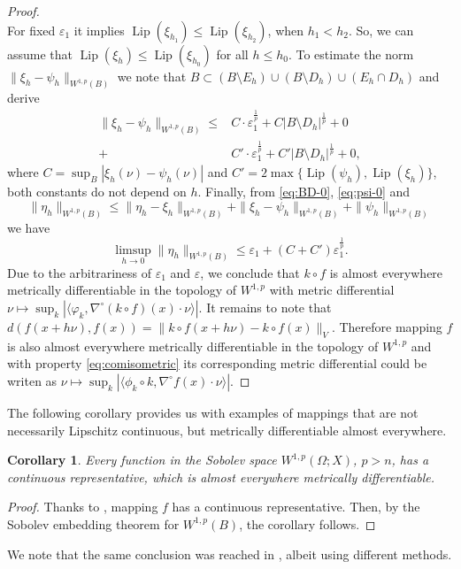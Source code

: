 \documentclass[reqno]{amsart}
\newtheorem{cor}[thm]{Corollary}
\begin{document}
\begin{proof}
\[\]
For fixed $\varepsilon_1$ it implies $\operatorname{Lip}(\xi_{h_1}) \leq \operatorname{Lip}(\xi_{h_2})$, when $h_1<h_2$.
So, we can assume that $\operatorname{Lip}(\xi_h) \leq \operatorname{Lip}(\xi_{h_0})$ for all $h\leq h_0$.
To estimate the norm $\|\xi_h - \psi_h \|_{W^{1,p}(B)}$ we note that $B\subset (B\setminus E_h)\cup (B\setminus D_h)\cup (E_h\cap D_h)$
and derive
\begin{align*}
\|\xi_h - \psi_h \|_{W^{1,p}(B)} \leq &C\cdot\varepsilon_1^{\frac{1}{p}} + C|B\setminus D_h|^{\frac{1}{p}} + 0\\
+ &C'\cdot\varepsilon_1^{\frac{1}{p}} + C'|B\setminus D_h|^{\frac{1}{p}} + 0,
\end{align*}
where $C = \sup_{B}|\xi_h(\nu) - \psi_h(\nu)| $ and $C' = 2\max\{\operatorname{Lip}(\psi_h), \operatorname{Lip}(\xi_h) \}$,
both constants do not depend on $h$.
Finally, from \eqref{eq:BD-0}, \eqref{eq:psi-0} and 
\[
\|\eta_h \|_{W^{1,p}(B)} \leq \|\eta_h -\xi_h \|_{W^{1,p}(B)} + \|\xi_h - \psi_h \|_{W^{1,p}(B)} + \|\psi_h \|_{W^{1,p}(B)}
\]
we have
\[
\limsup_{h\to 0 } \|\eta_h \|_{W^{1,p}(B)} \leq \varepsilon_1 + (C+ C')\varepsilon_1^{\frac{1}{p}}.
\]
Due to the arbitrariness of $\varepsilon_1$ and $\varepsilon$, we conclude that $k\circ f$ is almost everywhere metrically differentiable in the topology of $W^{1,p}$
with metric differential $\nu\mapsto \sup_k|  \langle \varphi_k, \nabla^{\circ} (k\circ f)(x)\cdot\nu \rangle|$.
It remains to note that $d(f(x+h\nu), f(x)) = \|k\circ f(x+h\nu) - k\circ f(x)\|_V$. Therefore mapping $f$ is also almost everywhere metrically differentiable in the topology of $W^{1,p}$
and with property \eqref{eq:comisometric} its corresponding metric differential could be writen as 
$\nu\mapsto \sup_k|  \langle \phi_k\circ k, \nabla^{\circ} f(x)\cdot\nu \rangle|$.
\end{proof}

The following corollary provides us with examples of mappings that are not necessarily Lipschitz continuous, but metrically differentiable almost everywhere.
\begin{cor}\label{cor:p-n}
Every function in the Sobolev space $W^{1,p}(\Omega; X)$, $p>n$, 
has a continuous representative, which is almost everywhere metrically differentiable.
\end{cor}
\begin{proof}
Thanks to \cite[Theorem 6.2]{Reshetnyak97}, mapping $f$ has a continuous representative.
Then, by the Sobolev embedding theorem for $W^{1,p}(B)$, the corollary follows.
\end{proof}
We note that the same conclusion was reached in \cite[Corollary 3.4]{K2007}, albeit using different methods.
\end{document}
